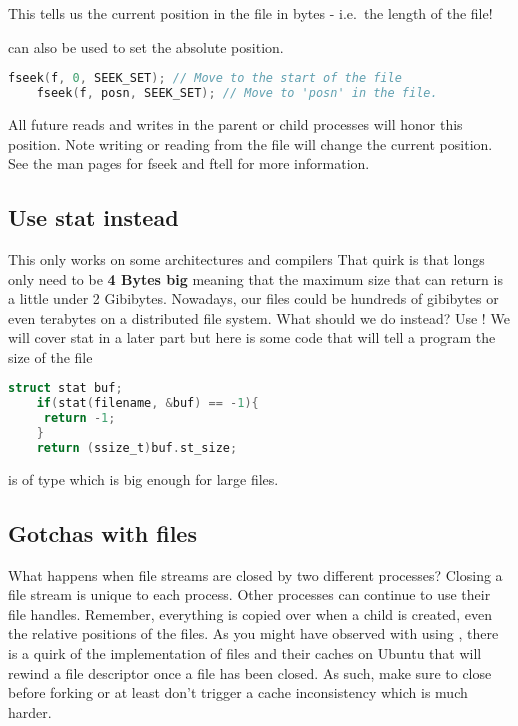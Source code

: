 This tells us the current position in the file in bytes - i.e.~the
length of the file!
	 
 can also be used to set the absolute position.
	 
\begin{lstlisting}[language=C]
	fseek(f, 0, SEEK_SET); // Move to the start of the file
	fseek(f, posn, SEEK_SET); // Move to 'posn' in the file.
\end{lstlisting}
	 
All future reads and writes in the parent or child processes will honor this position.
Note writing or reading from the file will change the current position.
See the man pages for fseek and ftell for more information.
	 
\subsection{Use stat instead}
	 
This only works on some architectures and compilers
That quirk is that longs only need to be \textbf{4 Bytes big} meaning that the maximum size that  can return is a little under 2 Gibibytes.
Nowadays, our files could be hundreds of gibibytes or even terabytes on a distributed file system.
What should we do instead? Use ! We will cover stat in a later part but here is some code that will tell a program the size of the file
	 
\begin{lstlisting}[language=C]
	struct stat buf;
	if(stat(filename, &buf) == -1){
	 return -1;
	}
	return (ssize_t)buf.st_size;
\end{lstlisting}
	 
 is of type  which is big enough for large files.
	 
\subsection{Gotchas with files}
	 
What happens when file streams are closed by two different processes?
Closing a file stream is unique to each process.
Other processes can continue to use their file handles.
Remember, everything is copied over when a child is created, even the relative positions of the files.
As you might have observed with using , there is a quirk of the implementation of files and their caches on Ubuntu that will rewind a file descriptor once a file has been closed.
As such, make sure to close before forking or at least don't trigger a cache inconsistency which is much harder.
	 

